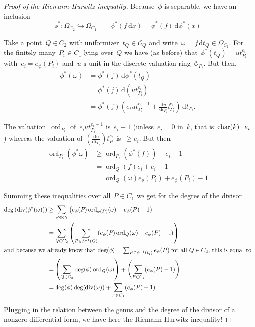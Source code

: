 \begin{proof}[Proof of the Riemann-Hurwitz inequality]
Because~$\phi$ is separable, we have an inclusion
\begin{equation}
  \phi^*\colon\Omega_{C_2} \hookrightarrow \Omega_{C_1} \qquad \phi^*(f\,\mathrm{d}x)=\phi^*(f)\,\mathrm{d} \phi^*(x)
\end{equation}

Take a point~$Q \in C_2$ with uniformizer~$t_Q \in \mathcal{O}_Q$ and write~$\omega = f\,\mathrm{d}t_Q \in \Omega_{C_2}$. For the finitely many~$P_i \in C_1$ lying over~$Q$ we have (as before) that~$\phi^*(t_Q) = u t_{P_i}^{e_i}$ with~$e_i = e_{\phi}(P_i)$ and~$u$ a unit in the discrete valuation ring~$\mathcal{O}_{P_i}$. But then,
\begin{equation}
  \begin{aligned}
    \phi^*(\omega) &= \phi^*(f)\,\mathrm{d} \phi^*(t_Q) \\
    &= \phi^*(f)\,\mathrm{d}(u t_{P_i}^{e_i}) \\
    &= \phi^*(f)\left(e_i u t_{P_i}^{e_i-1} + \frac{\mathrm{d}u}{\mathrm{d}t_{P_i}} t_{P_i}^{e_i}\right)\,\mathrm{d}t_{P_i}.
  \end{aligned}
\end{equation}

The valuation~$\operatorname{ord}_{P_i}$ of~$e_i u t_{P_i}^{e_i-1}$ is~$e_i-1$ (unless~$e_i=0$  in~$k$, that is~$\operatorname{char}(k) \mathbin{|} e_i$) whereas the valuation of~$(\tfrac{\mathrm{d}u}{\mathrm{d}t_{P_i}}) t_{P_i}^{e_i}$ is~$\geq e_i$. But then,
\begin{equation}
  \begin{aligned}
    \operatorname{ord}_{P_i}(\phi^* \omega) &\geq \operatorname{ord}_{P_i}(\phi^*(f)) + e_i -1 \\
    &= \operatorname{ord}_Q(f) e_i + e_i - 1 \\
    &= \operatorname{ord}_Q(\omega) e_{\phi}(P_i) + e_{\phi}(P_i) -1
  \end{aligned}
\end{equation}

Summing these inequalities over all~$P \in C_1$ we get for the degree of the divisor
\begin{align}
  \deg\left( \operatorname{div}(\phi^*(\omega)) \right) &\geq \sum_{P \in C_1} \left(e_{\phi}(P) \operatorname{ord}_{\phi(P)}(\omega)+e_{\phi}(P) -1 \right) \\
  &=\sum_{Q \in C_2} \left( \sum_{P \in \phi^{-1}(Q)} (e_{\phi}(P) \operatorname{ord}_Q(\omega) + e_{\phi}(P) -1) \right) \\
  \intertext{and because we already know that~$\deg(\phi) = \sum_{P \in \phi^{-1}(Q)} e_{\phi}(P)$ for all~$Q \in C_2$, this is equal to}
  &=\left( \sum_{Q \in C_2} \deg(\phi) \operatorname{ord}_Q(\omega) \right)+\left( \sum_{P \in C_1} (e_{\phi}(P)-1) \right) \\
  &=\deg(\phi)\deg(\operatorname{div}(\omega)) + \sum_{P \in C_1} (e_{\phi}(P)-1).
\end{align}

Plugging in the relation between the genus and the degree of the divisor of a nonzero differential form, we have here the Riemann-Hurwitz inequality!
\end{proof}
